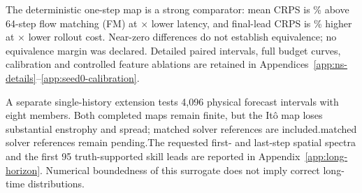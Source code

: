 The deterministic one-step map is a strong comparator: mean CRPS is \repFlowOneIntervalPercent\% above 64-step flow matching (FM) at \repFlowOneIntervalSpeed$\times$ lower latency, and final-lead CRPS is \repFlowOneRollPercent\% higher at \repFlowOneRollSpeed$\times$ lower rollout cost. Near-zero differences do not establish equivalence; no equivalence margin was declared. Detailed paired intervals, full budget curves, calibration and controlled feature ablations are retained in Appendices~\ref{app:ns-details}--\ref{app:seed0-calibration}.

A separate single-history extension tests 4,096 physical forecast intervals with eight members. Both completed maps remain finite, but the It\^o map loses substantial enstrophy and spread; \iflongAllModels matched solver references are included.\else matched solver references remain pending.\fi The requested first- and last-step spatial spectra and the first 95 truth-supported skill leads are reported in Appendix~\ref{app:long-horizon}. Numerical boundedness of this surrogate does not imply correct long-time distributions.
